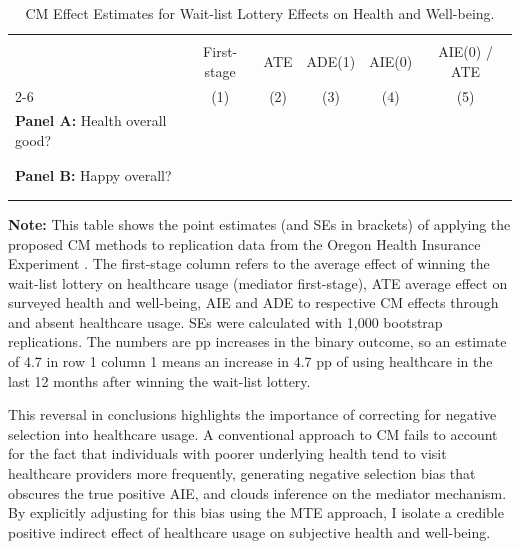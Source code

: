 \begin{table}[h!]
    \singlespacing
    \centering
    \small
    \caption{CM Effect Estimates for Wait-list Lottery Effects on Health and Well-being.}
    \begin{tabular}{l c c c c c}
        \\[-1.8ex]\hline \hline \\[-1.8ex] 
        & First-stage & ATE & ADE(1) & AIE(0) & AIE(0) / ATE \\
        \cmidrule(lr){2-6}
        & (1) & (2) & (3) & (4) & (5) \\
        \midrule
        \multicolumn{1}{l}{\textbf{Panel A:} Health overall good?} \\
        
        \\[-1.8ex]\hline \\[-1.8ex]
        \multicolumn{1}{l}{\textbf{Panel B:} Happy overall?} \\
        
        \\[-1.8ex]\hline \\[-1.8ex]
    \end{tabular}
    \vspace{-0.125cm}
    \label{tab:cm-oregon}
    \justify
    \footnotesize
    \textbf{Note:}
    This table shows the point estimates (and SEs in brackets) of applying the proposed CM methods to replication data from the Oregon Health Insurance Experiment \citep{icspr2014oregon}.
    The first-stage column refers to the average effect of winning the wait-list lottery on healthcare usage (mediator first-stage), ATE average effect on surveyed health and well-being, AIE and ADE to respective CM effects through and absent healthcare usage.
    SEs were calculated with 1,000 bootstrap replications.
    The numbers are pp increases in the binary outcome, so an estimate of 4.7 in row 1 column 1 means an increase in 4.7 pp of using healthcare in the last 12 months after winning the wait-list lottery.
\end{table}

This reversal in conclusions highlights the importance of correcting for negative selection into healthcare usage.
A conventional approach to CM fails to account for the fact that individuals with poorer underlying health tend to visit healthcare providers more frequently, generating negative selection bias that obscures the true positive AIE, and clouds inference on the mediator mechanism.
By explicitly adjusting for this bias using the MTE approach, I isolate a credible positive indirect effect of healthcare usage on subjective health and well-being.

